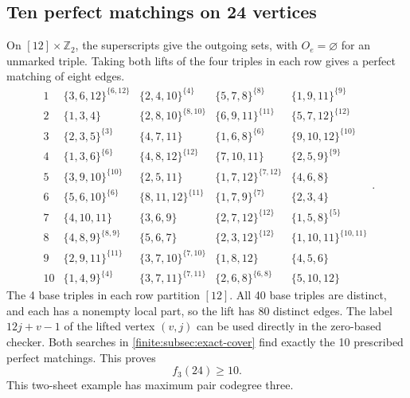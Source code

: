 \documentclass[10pt]{article}
\numberwithin{equation}{section}
\begin{document}
\subsection{Ten perfect matchings on 24 vertices}\label{finite:subsec:twentyfour}
On $[12]\times\mathbb Z_2$, the superscripts give the outgoing sets, with $O_e=\varnothing$ for an unmarked triple. Taking both lifts of the four triples in each row gives a perfect matching of eight edges.
{\small\setlength{\arraycolsep}{3pt}
\[
\begin{array}{c|cccc}
1&\{3,6,12\}^{\{6,12\}}&\{2,4,10\}^{\{4\}}&\{5,7,8\}^{\{8\}}&\{1,9,11\}^{\{9\}}\\
2&\{1,3,4\}&\{2,8,10\}^{\{8,10\}}&\{6,9,11\}^{\{11\}}&\{5,7,12\}^{\{12\}}\\
3&\{2,3,5\}^{\{3\}}&\{4,7,11\}&\{1,6,8\}^{\{6\}}&\{9,10,12\}^{\{10\}}\\
4&\{1,3,6\}^{\{6\}}&\{4,8,12\}^{\{12\}}&\{7,10,11\}&\{2,5,9\}^{\{9\}}\\
5&\{3,9,10\}^{\{10\}}&\{2,5,11\}&\{1,7,12\}^{\{7,12\}}&\{4,6,8\}\\
6&\{5,6,10\}^{\{6\}}&\{8,11,12\}^{\{11\}}&\{1,7,9\}^{\{7\}}&\{2,3,4\}\\
7&\{4,10,11\}&\{3,6,9\}&\{2,7,12\}^{\{12\}}&\{1,5,8\}^{\{5\}}\\
8&\{4,8,9\}^{\{8,9\}}&\{5,6,7\}&\{2,3,12\}^{\{12\}}&\{1,10,11\}^{\{10,11\}}\\
9&\{2,9,11\}^{\{11\}}&\{3,7,10\}^{\{7,10\}}&\{1,8,12\}&\{4,5,6\}\\
10&\{1,4,9\}^{\{4\}}&\{3,7,11\}^{\{7,11\}}&\{2,6,8\}^{\{6,8\}}&\{5,10,12\}
\end{array}.
\]
}
The 4 base triples in each row partition $[12]$. All 40 base triples are distinct, and each has a nonempty local part, so the lift has 80 distinct edges. The label $12j+v-1$ of the lifted vertex $(v,j)$ can be used directly in the zero-based checker. Both searches in \cref{finite:subsec:exact-cover} find exactly the 10 prescribed perfect matchings. This proves
\begin{equation}\label{finite:eq:ten24}
 f_3(24)\ge10.
\end{equation}
This two-sheet example has maximum pair codegree three.
\end{document}
